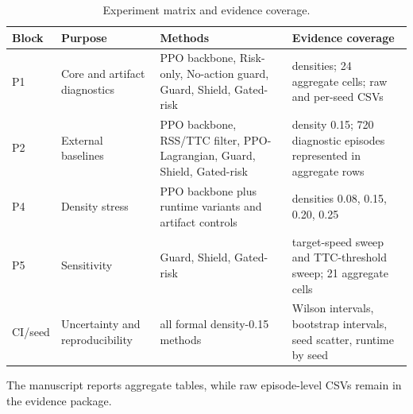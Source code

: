 \begin{table}[t]
\centering
\caption{Experiment matrix and evidence coverage.}
\label{tab_experiment_matrix}
\scriptsize
\setlength{\tabcolsep}{3.5pt}
\renewcommand{\arraystretch}{1.08}
\begin{tabular}{@{}>{\raggedright\arraybackslash}p{}>{\raggedright\arraybackslash}p{}>{\raggedright\arraybackslash}p{}>{\raggedright\arraybackslash}p{}@{}}
\toprule
Block & Purpose & Methods & Evidence coverage \\
\midrule
P1 & Core and artifact diagnostics & PPO backbone, Risk-only, No-action guard, Guard, Shield, Gated-risk & 4 densities; 24 aggregate cells; raw and per-seed CSVs \\
P2 & External baselines & PPO backbone, RSS/TTC filter, PPO-Lagrangian, Guard, Shield, Gated-risk & density 0.15; 720 diagnostic episodes represented in aggregate rows \\
P4 & Density stress & PPO backbone plus runtime variants and artifact controls & densities 0.08, 0.15, 0.20, 0.25 \\
P5 & Sensitivity & Guard, Shield, Gated-risk & target-speed sweep and TTC-threshold sweep; 21 aggregate cells \\
CI/seed & Uncertainty and reproducibility & all formal density-0.15 methods & Wilson intervals, bootstrap intervals, seed scatter, runtime by seed \\
\bottomrule
\end{tabular}
\begin{tablenotes}
\item The manuscript reports aggregate tables, while raw episode-level CSVs remain in the evidence package.
\end{tablenotes}
\end{table}
